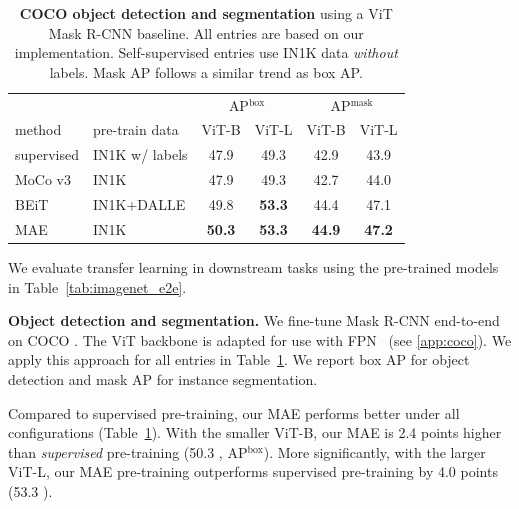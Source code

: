 \documentclass[10pt,twocolumn,letterpaper]{article}
\newcommand{\tablestyle}[2]{\setlength{\tabcolsep}{#1}\renewcommand{\arraystretch}{#2}\centering\footnotesize}
\renewcommand{\paragraph}[1]{\vspace{1.25mm}\noindent\textbf{#1}}
\newcommand{\gc}[1]{\textcolor{deemph}{#1}}
\begin{document}
\begin{table}[t]
\vspace{-1.5em} %
\tablestyle{5pt}{1.05}
\begin{tabular}{llcccc}
 & & \multicolumn{2}{c}{AP$^\text{box}$} & \multicolumn{2}{c}{\gc{AP$^\text{mask}$}} \\
method & pre-train data & ViT-B & ViT-L & \gc{ViT-B} & \gc{ViT-L} \\
\shline
supervised & \scriptsize IN1K w/ labels & 47.9 & 49.3 & \gc{42.9} & \gc{43.9} \\
MoCo v3 & \scriptsize IN1K & 47.9 & 49.3 & \gc{42.7} & \gc{44.0} \\
BEiT & \scriptsize IN1K+{DALLE} & 49.8 & \textbf{53.3} & \gc{44.4} & \gc{47.1} \\
\hline
MAE & \scriptsize IN1K & \textbf{50.3} & \textbf{53.3} & \gc{\textbf{44.9}} & \gc{\textbf{47.2}} \\
\end{tabular}
\vspace{-.7em}
\caption{\textbf{COCO object detection and segmentation} using a ViT Mask R-CNN baseline. All entries are based on our implementation. Self-supervised entries use IN1K data \textit{without} labels. Mask AP follows a similar trend as box AP.}
\label{tab:coco} \vspace{-1em}
\end{table}

We evaluate transfer learning in downstream tasks using the pre-trained models in Table~\ref{tab:imagenet_e2e}.

\paragraph{Object detection and segmentation.} We fine-tune Mask R-CNN \cite{He2017} end-to-end on COCO \cite{Lin2014}. The ViT backbone is adapted for use with FPN~\cite{Lin2017} (see \ref{app:coco}). We apply this approach for all entries in Table~\ref{tab:coco}. We report box AP for object detection and mask AP for instance segmentation.

Compared to supervised pre-training, our MAE performs better under all configurations (Table~\ref{tab:coco}). With the smaller ViT-B, our MAE is 2.4 points higher than \textit{supervised} pre-training (50.3 , AP$^\text{box}$). More significantly, with the larger ViT-L, our MAE pre-training outperforms supervised pre-training by 4.0 points (53.3 ).
\end{document}
